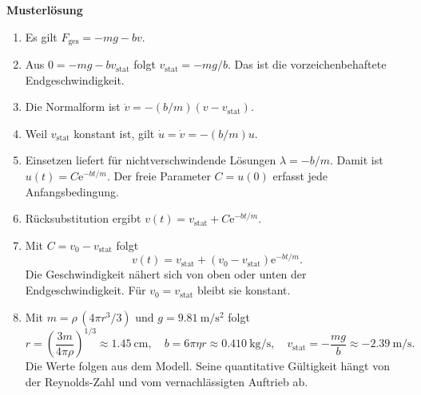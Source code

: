 \begin{Solution}
\par\medskip\noindent\textbf{Musterlösung}\par\nopagebreak[4]
\begin{enumerate}
\item Es gilt $F_\mathrm{ges}=-mg-bv$.
\item Aus $0=-mg-bv_\mathrm{stat}$ folgt $v_\mathrm{stat}=-mg/b$. Das ist die vorzeichenbehaftete Endgeschwindigkeit.
\item Die Normalform ist $\dot v=-(b/m)(v-v_\mathrm{stat})$.
\item Weil $v_\mathrm{stat}$ konstant ist, gilt $\dot u=\dot v=-(b/m)u$.
\item Einsetzen liefert für nichtverschwindende Lösungen $\lambda=-b/m$. Damit ist $u(t)=C\mathrm e^{-bt/m}$. Der freie Parameter $C=u(0)$ erfasst jede Anfangsbedingung.
\item Rücksubstitution ergibt $v(t)=v_\mathrm{stat}+C\mathrm e^{-bt/m}$.
\item Mit $C=v_0-v_\mathrm{stat}$ folgt
\[
 v(t)=v_\mathrm{stat}+(v_0-v_\mathrm{stat})\mathrm e^{-bt/m}.
\]
Die Geschwindigkeit nähert sich von oben oder unten der Endgeschwindigkeit. Für $v_0=v_\mathrm{stat}$ bleibt sie konstant.
\begin{center}
\end{center}
\item Mit $m=\rho\,(4\pi r^3/3)$ und $g=\qty{9.81}{\metre\per\second\squared}$ folgt
\[
 r=\left(\frac{3m}{4\pi\rho}\right)^{1/3}\approx\qty{1.45}{\centi\metre},
 \quad b=6\pi\eta r\approx\qty{0.410}{\kilogram\per\second},
 \quad v_\mathrm{stat}=-\frac{mg}{b}\approx\qty{-2.39}{\metre\per\second}.
\]
Die Werte folgen aus dem Modell. Seine quantitative Gültigkeit hängt von der Reynolds-Zahl und vom vernachlässigten Auftrieb ab.
\end{enumerate}
\end{Solution}
